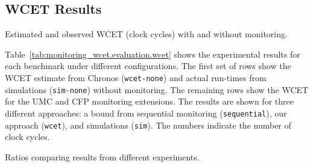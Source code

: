 \subsection{WCET Results}

\begin{table}
  \begin{center}
    \begin{scriptsize}
    
    \end{scriptsize}
    \caption{Estimated and observed WCET (clock cycles) with and without monitoring.}
    \label{tab:monitoring_wcet.evaluation.wcet}
  \end{center}
\end{table}

Table~\ref{tab:monitoring_wcet.evaluation.wcet} shows the experimental results
for each benchmark under different configurations. The first set of rows show
the WCET estimate from Chronos ({\tt wcet-none}) and actual run-times from
simulations ({\tt sim-none}) without monitoring. The remaining rows show the
WCET for the UMC and CFP monitoring extensions. The results are shown for three
different approaches: a bound from sequential monitoring ({\tt sequential}),
our approach ({\tt wcet}), and simulations ({\tt sim}). The numbers indicate
the number of clock cycles.

\begin{table}
  \begin{center}
    \begin{tiny}
    
    \end{tiny}
    \caption{Ratios comparing results from different experiments.} 
    \label{tab:monitoring_wcet.evaluation.ratios}
  \end{center}
\end{table}

